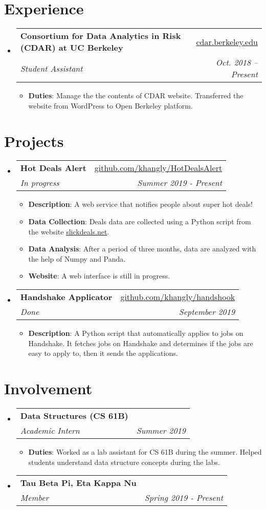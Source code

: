 \documentclass[letterpaper,11pt]{article}
\makeatletter
\newcommand{\resumeItem}[2]{
  \item\small{
    \textbf{#1}{: #2 \vspace{-2pt}}
  }
}
\newcommand{\resumeSubheading}[4]{
  \vspace{-1pt}\item
    \begin{tabular*}{0.97\textwidth}[t]{l@{\extracolsep{\fill}}r}
      \textbf{#1} & #2 \\
      \textit{\small#3} & \textit{\small #4} \\
    \end{tabular*}\vspace{-5pt}
}
\newcommand{\resumeSubHeadingListStart}{\begin{itemize}[leftmargin=*]}
\newcommand{\resumeSubHeadingListEnd}{\end{itemize}}
\newcommand{\resumeItemListStart}{\begin{itemize}}
\newcommand{\resumeItemListEnd}{\end{itemize}\vspace{-5pt}}
\makeatother
\begin{document}
\section{Experience}
  \resumeSubHeadingListStart
    \resumeSubheading
      {Consortium for Data Analytics in Risk (CDAR) at UC Berkeley}{\href{http://cdar.berkeley.edu}{cdar.berkeley.edu}}
      {Student Assistant}{Oct. 2018 – Present}
      \resumeItemListStart
        \resumeItem{Duties}
          {Manage the the contents of CDAR website. Transferred the website from WordPress to Open Berkeley platform.}
      \resumeItemListEnd
  \resumeSubHeadingListEnd


\section{Projects}
  \resumeSubHeadingListStart
    \resumeSubheading
    	{Hot Deals Alert}{\href{https://github.com/khangly/HotDealsAlert}{github.com/khangly/HotDealsAlert}}
    	{In progress}{Summer 2019 - Present}
      \resumeItemListStart
        \resumeItem{Description}
          {A web service that notifies people about super hot deals!}
        \resumeItem{Data Collection}
          {Deals data are collected using a Python script from the website \href{https://slickdeals.net}{slickdeals.net}.}
        \resumeItem{Data Analysis}
          {After a period of three months, data are analyzed with the help of Numpy and Panda.}
        \resumeItem{Website}
          {A web interface is still in progress.}
      \resumeItemListEnd
    \resumeSubheading
    	{Handshake Applicator}{\href{https://github.com/khangly/handshook}{github.com/khangly/handshook}}
    	{Done}{September 2019}
      \resumeItemListStart
        \resumeItem{Description}
          {A Python script that automatically applies to jobs on Handshake. It fetches jobs on Handshake and determines if the jobs are easy to apply to, then it sends the applications.}
      \resumeItemListEnd
  \resumeSubHeadingListEnd


\section{Involvement}
  \resumeSubHeadingListStart
    \resumeSubheading
      {Data Structures (CS 61B)}{}
      {Academic Intern}{Summer 2019}
      \resumeItemListStart
        \resumeItem{Duties}
          {Worked as a lab assistant for CS 61B during the summer. Helped students understand data structure concepts during the labs.}
      \resumeItemListEnd
    \resumeSubheading
      {Tau Beta Pi, Eta Kappa Nu}{}
      {Member}{Spring 2019 - Present}
  \resumeSubHeadingListEnd
\end{document}
